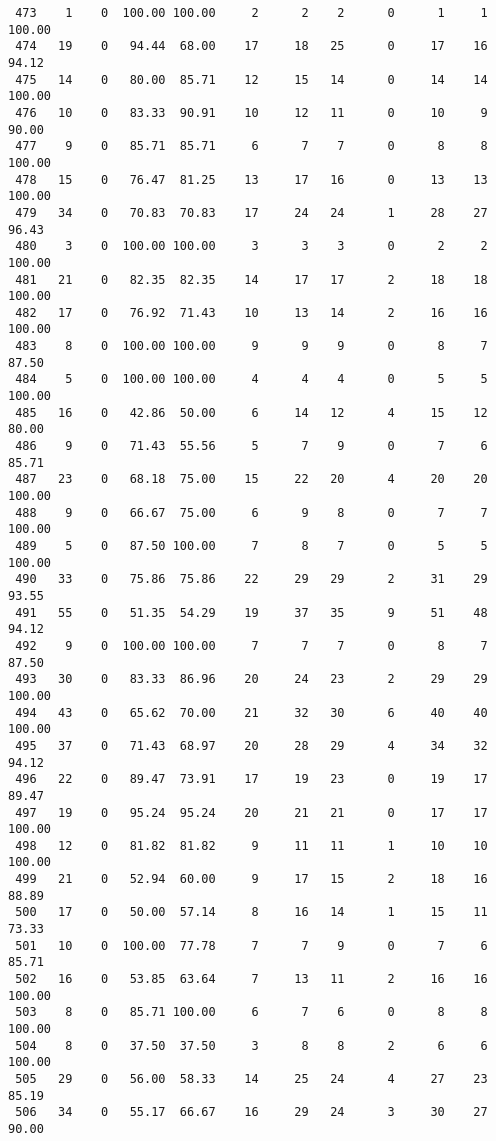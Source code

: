 \begin{verbatim}
 473    1    0  100.00 100.00     2      2    2      0      1     1   100.00
 474   19    0   94.44  68.00    17     18   25      0     17    16    94.12
 475   14    0   80.00  85.71    12     15   14      0     14    14   100.00
 476   10    0   83.33  90.91    10     12   11      0     10     9    90.00
 477    9    0   85.71  85.71     6      7    7      0      8     8   100.00
 478   15    0   76.47  81.25    13     17   16      0     13    13   100.00
 479   34    0   70.83  70.83    17     24   24      1     28    27    96.43
 480    3    0  100.00 100.00     3      3    3      0      2     2   100.00
 481   21    0   82.35  82.35    14     17   17      2     18    18   100.00
 482   17    0   76.92  71.43    10     13   14      2     16    16   100.00
 483    8    0  100.00 100.00     9      9    9      0      8     7    87.50
 484    5    0  100.00 100.00     4      4    4      0      5     5   100.00
 485   16    0   42.86  50.00     6     14   12      4     15    12    80.00
 486    9    0   71.43  55.56     5      7    9      0      7     6    85.71
 487   23    0   68.18  75.00    15     22   20      4     20    20   100.00
 488    9    0   66.67  75.00     6      9    8      0      7     7   100.00
 489    5    0   87.50 100.00     7      8    7      0      5     5   100.00
 490   33    0   75.86  75.86    22     29   29      2     31    29    93.55
 491   55    0   51.35  54.29    19     37   35      9     51    48    94.12
 492    9    0  100.00 100.00     7      7    7      0      8     7    87.50
 493   30    0   83.33  86.96    20     24   23      2     29    29   100.00
 494   43    0   65.62  70.00    21     32   30      6     40    40   100.00
 495   37    0   71.43  68.97    20     28   29      4     34    32    94.12
 496   22    0   89.47  73.91    17     19   23      0     19    17    89.47
 497   19    0   95.24  95.24    20     21   21      0     17    17   100.00
 498   12    0   81.82  81.82     9     11   11      1     10    10   100.00
 499   21    0   52.94  60.00     9     17   15      2     18    16    88.89
 500   17    0   50.00  57.14     8     16   14      1     15    11    73.33
 501   10    0  100.00  77.78     7      7    9      0      7     6    85.71
 502   16    0   53.85  63.64     7     13   11      2     16    16   100.00
 503    8    0   85.71 100.00     6      7    6      0      8     8   100.00
 504    8    0   37.50  37.50     3      8    8      2      6     6   100.00
 505   29    0   56.00  58.33    14     25   24      4     27    23    85.19
 506   34    0   55.17  66.67    16     29   24      3     30    27    90.00

\end{verbatim}
